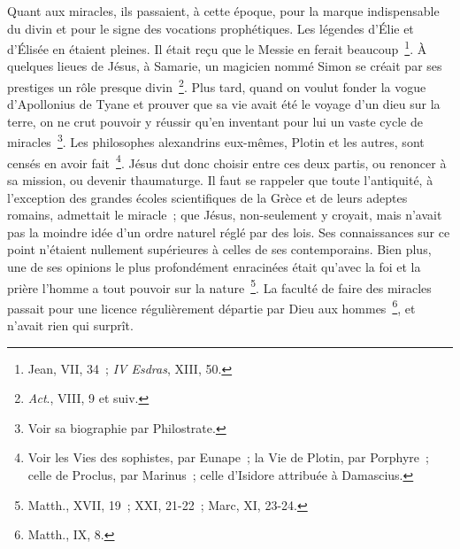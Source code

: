 \documentclass[french,twoside]{book} %
\begin{document}
Quant aux miracles, ils passaient, à cette époque, pour la marque indispensable du divin et pour le signe des vocations prophétiques. Les légendes d’Élie et d’Élisée en étaient pleines. Il était reçu que le Messie en ferait beaucoup \footnote{ Jean, VII, 34 ; {\itshape IV Esdras}, XIII, 50.}. À quelques lieues de Jésus, à Samarie, un magicien nommé Simon se créait par ses prestiges un rôle presque divin \footnote{{\itshape Act}., VIII, 9 et suiv.}. Plus tard, quand on voulut fonder la vogue d’Apollonius de Tyane et prouver que sa vie avait été le voyage d’un dieu sur la terre, on ne crut pouvoir y réussir qu’en inventant pour lui un vaste cycle de miracles \footnote{Voir sa biographie par Philostrate.}. Les philosophes alexandrins eux-mêmes, Plotin et les autres, sont censés en avoir fait \footnote{Voir les Vies des sophistes, par Eunape ; la Vie de Plotin, par Porphyre ; celle de Proclus, par Marinus ; celle d’Isidore attribuée à Damascius.}. Jésus dut donc choisir entre ces deux partis, ou renoncer à sa mission, ou devenir thaumaturge. Il faut se rappeler que toute l’antiquité, à l’exception des grandes écoles scientifiques de la Grèce et de leurs adeptes romains, admettait le miracle ; que Jésus, non-seulement y croyait, mais n’avait pas la moindre idée d’un ordre naturel réglé par des lois. Ses connaissances sur ce point n’étaient nullement supérieures à celles de ses contemporains. Bien plus, une de ses opinions le plus profondément enracinées était qu’avec la foi et la prière l’homme a tout pouvoir sur la nature \footnote{Matth., XVII, 19 ; XXI, 21-22 ; Marc, XI, 23-24.}. La faculté de faire des miracles passait pour une licence régulièrement départie par Dieu aux hommes \footnote{Matth., IX, 8.}, et n’avait rien qui surprît.\par
\end{document}
